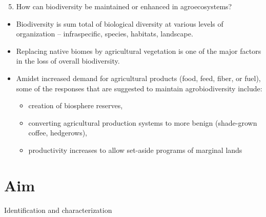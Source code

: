 \documentclass[
  ignorenonframetext,
  aspectratio=169]{beamer}
\providecommand{\tightlist}{%
  \setlength{\itemsep}{0pt}\setlength{\parskip}{0pt}}
\begin{document}
\begin{frame}{}
\protect\hypertarget{section-15}{}
\begin{enumerate}[<+->]
\setcounter{enumi}{4}
\tightlist
\item
  \alert{How can biodiversity be maintained or enhanced in agroecosystems?}
\end{enumerate}

\begin{itemize}[<+->]
\tightlist
\item
  Biodiversity is sum total of biological diversity at various levels of
  organization -- infraspecific, species, habitats, landscape.
\item
  Replacing native biomes by agricultural vegetation is one of the major
  factors in the loss of overall biodiversity.
\item
  Amidst increased demand for agricultural products (food, feed, fiber,
  or fuel), some of the responses that are suggested to maintain
  agrobiodiversity include:

  \begin{itemize}[<+->]
  \tightlist
  \item
    creation of biosphere reserves,
  \item
    converting agricultural production systems to more benign
    (shade-grown coffee, hedgerows),
  \item
    productivity increases to allow set-aside programs of marginal lands
  \end{itemize}
\end{itemize}
\end{frame}

\hypertarget{aim}{%
\section{Aim}\label{aim}}

\begin{frame}{Identification and characterization}
\protect\hypertarget{identification-and-characterization}{}
\end{frame}
\end{document}
